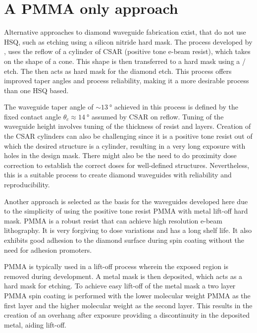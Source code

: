 \section*{A \gls{PMMA} only approach}

Alternative approaches to diamond waveguide fabrication exist, that do not use \gls{HSQ}, such as etching using a silicon nitride hard mask. The process developed by \textcite{wanEfficientExtractionLight2018a, simonBuildingPlatformMagnetic2023}, uses the reflow of a cylinder of CSAR (positive tone e-beam resist), which takes on the shape of a cone. This shape is then transferred to a  hard mask using a / etch. The  then acts as hard mask for the diamond etch. This process offers improved taper angles and process reliability, making it a more desirable process than one \gls{HSQ} based. 

The waveguide taper angle of $\sim\qty{13}{\degree}$ achieved in this process is defined by the fixed contact angle $\theta_c \approx \qty{14}{\degree}$ assumed by CSAR on reflow. Tuning of the waveguide height involves tuning of the thickness of resist and  layers. Creation of the CSAR cylinders can also be challenging since it is a positive tone resist out of which the desired structure is a cylinder, resulting in a very long exposure with holes in the design mask. There might also be the need to do proximity dose correction to establish the correct doses for well-defined structures. Nevertheless, this is a suitable process to create diamond waveguides with reliability and reproducibility.

Another approach is selected as the basis for the waveguides developed here due to the simplicity of using the positive tone resist \gls{PMMA} with metal lift-off hard mask\cite{zhuMulticoneDiamondWaveguides2023a}. \gls{PMMA} is a robust resist that can achieve high resolution e-beam lithography. It is very forgiving to dose variations and has a long shelf life. It also exhibits good adhesion to the diamond surface during spin coating without the need for adhesion promoters. 

\gls{PMMA} is typically used in a lift-off process wherein the exposed region is removed during development. A metal mask is then deposited, which acts as a hard mask for etching. To achieve easy lift-off of the metal mask a two layer \gls{PMMA} spin coating is performed with the lower molecular weight \gls{PMMA} as the first layer and the higher molecular weight as the second layer. This results in the creation of an overhang after exposure providing a discontinuity in the deposited metal, aiding lift-off. 

